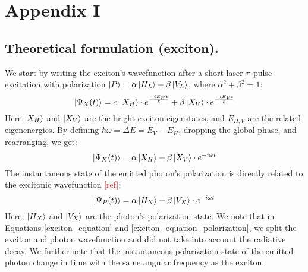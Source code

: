 \section{Appendix I}\label{appendix1}
\subsection*{Theoretical formulation (exciton).}
We start by writing the exciton's wavefunction after a short laser $\pi$-pulse excitation with polarization $\ket{P}=\alpha\ket{H_L}+\beta\ket{V_L}$, where $\alpha^2+\beta^2=1$:
\begin{equation}
	\ket{\Psi_X(t)} = \alpha\ket{X_H}\cdot e^{\frac{-iE_H t}{\hslash}}+\beta\ket{X_V}\cdot e^{\frac{-iE_Vt}{\hslash}}
\end{equation}
Here $\ket{X_H}$ and $\ket{X_V}$ are the bright exciton eigenstates, and $E_{H,V}$ are the related eigenenergies.
By defining $\hbar\omega=\Delta E=E_V-E_H$, dropping the global phase, and rearranging, we get:
\begin{equation}\label{exciton_equation}
	\ket{\Psi_X(t)} = \alpha\ket{X_H} + \beta\ket{X_V}\cdot e^{-i\omega t}
\end{equation}
The instantaneous state of the emitted photon's polarization is directly related to the excitonic wavefunction \textcolor{red}{[ref]}:
\begin{equation}\label{exciton_equation_polarization}
	\ket{\Psi_P(t)} = \alpha\ket{H_X}+\beta\ket{V_X}\cdot e^{-i\omega t}
\end{equation}
Here, $\ket{H_X}$ and $\ket{V_X}$ are the photon's polarization state.
We note that in Equations \ref{exciton_equation} and \ref{exciton_equation_polarization}, we split the exciton and photon wavefunction and did not take into account the radiative decay.
We further note that the instantaneous polarization state of the emitted photon change in time with the same angular frequency as the exciton.


